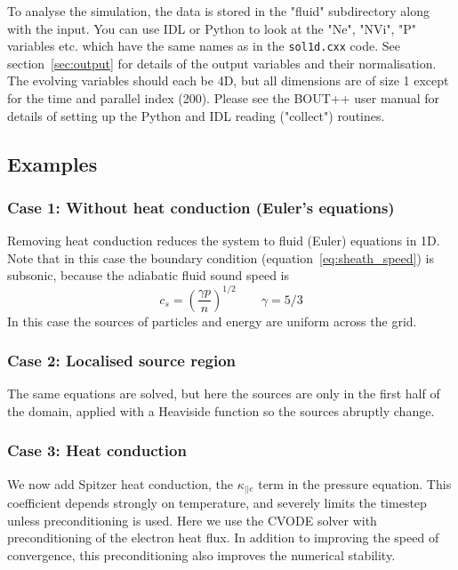 \documentclass[12pt,a4paper]{article}
\begin{document}
To analyse the simulation, the data is stored in the "fluid" subdirectory along with the input. You can use IDL or Python to look at the "Ne", "NVi", "P" variables etc. which have the same names as in the \texttt{sol1d.cxx} code. See section~\ref{sec:output} for
details of the output variables and their normalisation. The evolving variables should each be 4D, but all dimensions are of size 1 except for the time and parallel index (200). Please see the BOUT++ user manual for details of setting up the Python and IDL reading ("collect") routines. 


\subsection{Examples}

\subsubsection{Case 1: Without heat conduction (Euler's equations)}

Removing heat conduction reduces the system to fluid (Euler) equations in 1D.
Note that in this case the boundary condition (equation~\ref{eq:sheath_speed}) is subsonic, because
the adiabatic fluid sound speed is
\[
c_s = \left( \frac{\gamma p}{n}\right)^{1/2} \qquad \gamma = 5/3
\]
In this case the sources of particles and energy are uniform across the grid.

\subsubsection{Case 2: Localised source region}

The same equations are solved, but here the sources are only in the first half of the domain, 
applied with a Heaviside function so the sources abruptly change.

\subsubsection{Case 3: Heat conduction}

We now add Spitzer heat conduction, the $\kappa_{||e}$ term in the pressure equation. This coefficient depends strongly on temperature, and severely limits the timestep unless preconditioning is used. Here we use the CVODE solver with preconditioning of the electron heat flux. In addition to improving
the speed of convergence, this preconditioning also improves the numerical stability.
\end{document}
